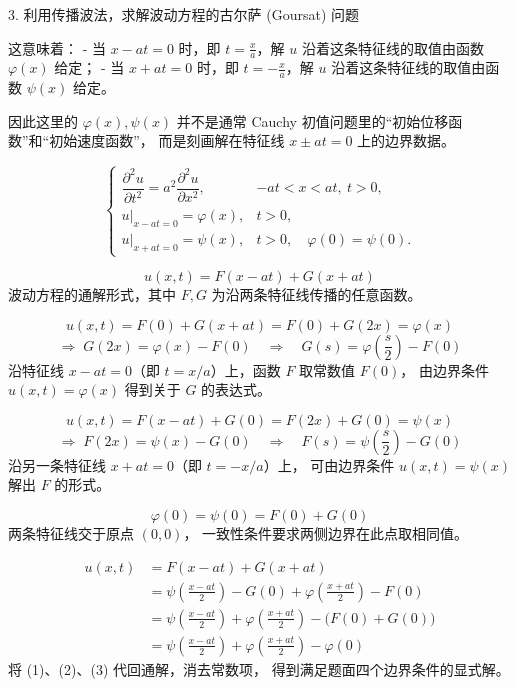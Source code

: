 \begin{exercise}
3. 利用传播波法，求解波动方程的古尔萨 (Goursat) 问题
\begin{dxtips}
   这意味着：
- 当 $x-at=0$ 时，即 $t=\tfrac{x}{a}$，解 $u$ 沿着这条特征线的取值由函数 $\varphi(x)$ 给定；
- 当 $x+at=0$ 时，即 $t=-\tfrac{x}{a}$，解 $u$ 沿着这条特征线的取值由函数 $\psi(x)$ 给定。

因此这里的 $\varphi(x), \psi(x)$ 并不是通常 Cauchy 初值问题里的“初始位移函数”和“初始速度函数”，
而是刻画解在特征线 $x\pm at=0$ 上的边界数据。
\end{dxtips}
\[
\begin{cases}
\dfrac{\partial^2 u}{\partial t^2} = a^2 \dfrac{\partial^2 u}{\partial x^2}, & -at < x < at,\ t>0, \\[6pt]
u\big|_{x-at=0} = \varphi(x), & t>0, \\[6pt]
u\big|_{x+at=0} = \psi(x), & t>0,\quad \varphi(0)=\psi(0).
\end{cases}
\]
\end{exercise}


\begin{dxsolution}
\[
u(x,t)=F(x-at)+G(x+at)
\]
\tcblower
波动方程的通解形式，其中 $F,G$ 为沿两条特征线传播的任意函数。
\end{dxsolution}

\begin{dxsolution}
\[
u(x,t)=F(0)+G(x+at)=F(0)+G(2x)=\varphi(x)
\]
\[
\Longrightarrow\;
G(2x)=\varphi(x)-F(0)
\quad\Rightarrow\quad
G(s)=\varphi\!\left(\frac{s}{2}\right)-F(0)
\tag{1}
\]
\tcblower
沿特征线 $x-at=0$（即 $t=x/a$）上，函数 $F$ 取常数值 $F(0)$，  
由边界条件 $u(x,t)=\varphi(x)$ 得到关于 $G$ 的表达式。
\end{dxsolution}

\begin{dxsolution}
\[
u(x,t)=F(x-at)+G(0)=F(2x)+G(0)=\psi(x)
\]
\[
\Longrightarrow\;
F(2x)=\psi(x)-G(0)
\quad\Rightarrow\quad
F(s)=\psi\!\left(\frac{s}{2}\right)-G(0)
\tag{2}
\]
\tcblower
沿另一条特征线 $x+at=0$（即 $t=-x/a$）上，  
可由边界条件 $u(x,t)=\psi(x)$ 解出 $F$ 的形式。
\end{dxsolution}

\begin{dxsolution}
\[
\varphi(0)=\psi(0)=F(0)+G(0)
\tag{3}
\]
\tcblower
两条特征线交于原点 $(0,0)$，  
一致性条件要求两侧边界在此点取相同值。
\end{dxsolution}

\begin{dxsolution}
\[
\begin{aligned}
u(x,t)
&= F(x-at)+G(x+at)\\
&= \psi\!\left(\frac{x-at}{2}\right)-G(0)
   +\varphi\!\left(\frac{x+at}{2}\right)-F(0)\\
&= \psi\!\left(\frac{x-at}{2}\right)
   +\varphi\!\left(\frac{x+at}{2}\right)
   -\bigl(F(0)+G(0)\bigr)\\
&= \psi\!\left(\frac{x-at}{2}\right)
   +\varphi\!\left(\frac{x+at}{2}\right)
   -\varphi(0)
\end{aligned}
\]
\tcblower
将 (1)、(2)、(3) 代回通解，消去常数项，  
得到满足题面四个边界条件的显式解。
\end{dxsolution}

